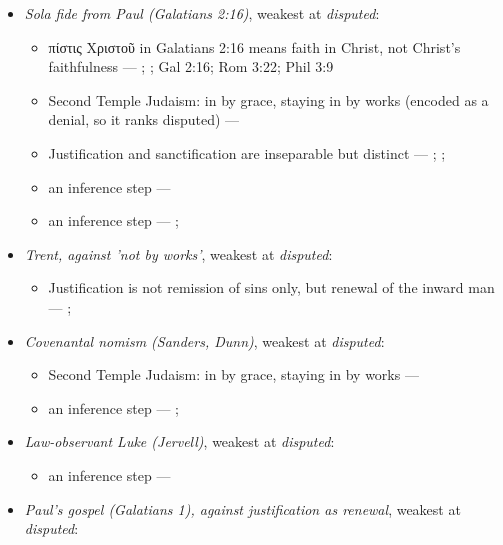 \documentclass[11pt]{article}
\begin{document}
\begin{itemize}
\item \emph{Sola fide from Paul (Galatians 2:16)}, weakest at \emph{disputed}:
\begin{itemize}
\item πίστις Χριστοῦ in Galatians 2:16 means faith in Christ, not Christ's faithfulness --- \cite{dunn-once-more-pistis-christou-1991}; \cite{matlock-detheologizing-2000}; Gal 2:16; Rom 3:22; Phil 3:9
\item Second Temple Judaism: in by grace, staying in by works (encoded as a denial, so it ranks disputed) --- \cite{sanders-paul-palestinian-judaism-1977}
\item Justification and sanctification are inseparable but distinct --- \cite[XIII.1]{westminster-confession-1647}; \cite[XI.1]{westminster-confession-1647}; \cite[III.xi.6]{calvin-institutes-1960}
\item an inference step --- \cite[Trent, Session VI (1547), canon 9]{tanner-decrees-1990}
\item an inference step --- \cite{gathercole-where-boasting-2002}; \cite{carson-variegated-nomism-1-2001}
\end{itemize}
\item \emph{Trent, against 'not by works'}, weakest at \emph{disputed}:
\begin{itemize}
\item Justification is not remission of sins only, but renewal of the inward man --- \cite[Trent, Session VI (1547), Decree on Justification, ch. 7]{tanner-decrees-1990}; \cite[Trent, Session VI (1547), canon 11]{tanner-decrees-1990}
\end{itemize}
\item \emph{Covenantal nomism (Sanders, Dunn)}, weakest at \emph{disputed}:
\begin{itemize}
\item Second Temple Judaism: in by grace, staying in by works --- \cite{sanders-paul-palestinian-judaism-1977}
\item an inference step --- \cite{dunn-new-perspective-2005}; \cite{wright-what-paul-said-1997}
\end{itemize}
\item \emph{Law-observant Luke (Jervell)}, weakest at \emph{disputed}:
\begin{itemize}
\item an inference step --- \cite{jervell-luke-people-god-1972}
\end{itemize}
\item \emph{Paul's gospel (Galatians 1), against justification as renewal}, weakest at \emph{disputed}:

\end{itemize}
\end{document}
